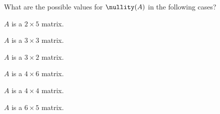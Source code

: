 \begin{exercise}  
What are the possible values for \(\nullity(A)\) in the following cases?
\begin{Parts}
\item \(A\) is a \(2\times 5\) matrix.

\item \(A\) is a \(3\times 3\) matrix.

\item \(A\) is a \(3\times 2\) matrix.

\item \(A\) is a \(4\times 6\) matrix.

\item \(A\) is a \(4\times 4\) matrix.

\item \(A\) is a \(6\times 5\) matrix.

\end{Parts}
\end{exercise}






